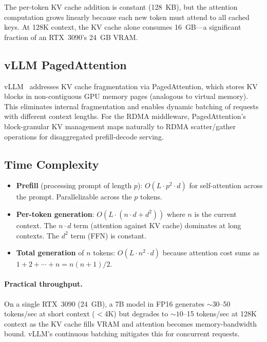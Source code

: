 \documentclass[11pt,letterpaper]{article}
\begin{document}
The per-token KV cache addition is constant (128~KB), but the attention computation grows linearly because each new token must attend to all cached keys. At 128K context, the KV cache alone consumes 16~GB---a significant fraction of an RTX~3090's 24~GB VRAM.

\subsection{vLLM PagedAttention}

vLLM~\cite{vllm} addresses KV cache fragmentation via PagedAttention, which stores KV blocks in non-contiguous GPU memory pages (analogous to virtual memory). This eliminates internal fragmentation and enables dynamic batching of requests with different context lengths. For the RDMA middleware, PagedAttention's block-granular KV management maps naturally to RDMA scatter/gather operations for disaggregated prefill-decode serving.

\subsection{Time Complexity}

\begin{itemize}[noitemsep]
    \item \textbf{Prefill} (processing prompt of length $p$): $O(L \cdot p^2 \cdot d)$ for self-attention across the prompt. Parallelizable across the $p$ tokens.
    \item \textbf{Per-token generation}: $O(L \cdot (n \cdot d + d^2))$ where $n$ is the current context. The $n \cdot d$ term (attention against KV cache) dominates at long contexts. The $d^2$ term (FFN) is constant.
    \item \textbf{Total generation} of $n$ tokens: $O(L \cdot n^2 \cdot d)$ because attention cost sums as $1 + 2 + \cdots + n = n(n+1)/2$.
\end{itemize}

\paragraph{Practical throughput.}
On a single RTX~3090 (24~GB), a 7B model in FP16 generates ${\sim}30$--50 tokens/sec at short context ($<$4K) but degrades to ${\sim}10$--15 tokens/sec at 128K context as the KV cache fills VRAM and attention becomes memory-bandwidth bound. vLLM's continuous batching mitigates this for concurrent requests.

\end{document}
